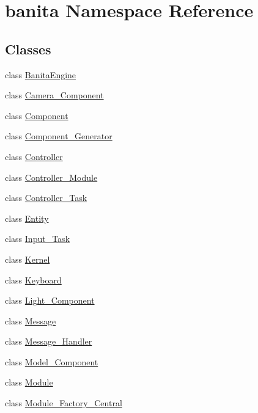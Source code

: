 \hypertarget{namespacebanita}{}\section{banita Namespace Reference}
\label{namespacebanita}
\subsection*{Classes}
\begin{DoxyCompactItemize}
\item 
class \mbox{\hyperlink{classbanita_1_1_banita_engine}{Banita\+Engine}}
\item 
class \mbox{\hyperlink{classbanita_1_1_camera___component}{Camera\+\_\+\+Component}}
\item 
class \mbox{\hyperlink{classbanita_1_1_component}{Component}}
\item 
class \mbox{\hyperlink{classbanita_1_1_component___generator}{Component\+\_\+\+Generator}}
\item 
class \mbox{\hyperlink{classbanita_1_1_controller}{Controller}}
\item 
class \mbox{\hyperlink{classbanita_1_1_controller___module}{Controller\+\_\+\+Module}}
\item 
class \mbox{\hyperlink{classbanita_1_1_controller___task}{Controller\+\_\+\+Task}}
\item 
class \mbox{\hyperlink{classbanita_1_1_entity}{Entity}}
\item 
class \mbox{\hyperlink{classbanita_1_1_input___task}{Input\+\_\+\+Task}}
\item 
class \mbox{\hyperlink{classbanita_1_1_kernel}{Kernel}}
\item 
class \mbox{\hyperlink{classbanita_1_1_keyboard}{Keyboard}}
\item 
class \mbox{\hyperlink{classbanita_1_1_light___component}{Light\+\_\+\+Component}}
\item 
class \mbox{\hyperlink{classbanita_1_1_message}{Message}}
\item 
class \mbox{\hyperlink{classbanita_1_1_message___handler}{Message\+\_\+\+Handler}}
\item 
class \mbox{\hyperlink{classbanita_1_1_model___component}{Model\+\_\+\+Component}}
\item 
class \mbox{\hyperlink{classbanita_1_1_module}{Module}}
\item 
class \mbox{\hyperlink{classbanita_1_1_module___factory___central}{Module\+\_\+\+Factory\+\_\+\+Central}}
\item 

\end{DoxyCompactItemize}
